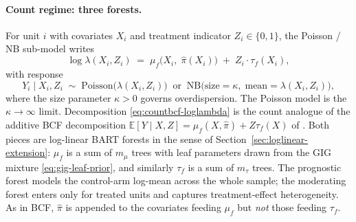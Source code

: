 \documentclass[11pt]{article}
\theoremstyle{plain}
\theoremstyle{definition}
\theoremstyle{remark}
\newcommand{\Poi}{\mathrm{Poisson}}
\newcommand{\NB}{\mathrm{NB}}
\newcommand{\E}{\mathbb{E}}
\newcommand{\muF}{\mu_f}
\newcommand{\tauF}{\tau_f}
\newcommand{\pihat}{\widehat{\pi}}
\begin{document}
\paragraph{Count regime: three forests.}
For unit $i$ with covariates $X_i$ and treatment indicator
$Z_i \in \{0, 1\}$, the Poisson / NB sub-model writes
\begin{equation}
  \boxed{\;
    \log \lambda(X_i, Z_i)
    \;=\;
    \muF\!\bigl(X_i,\; \pihat(X_i)\bigr)
    \;+\;
    Z_i \cdot \tauF(X_i),
  \;}
  \label{eq:countbcf-loglambda}
\end{equation}
with response
\begin{equation}
  Y_i \mid X_i, Z_i
  \;\sim\;
  \Poi\bigl(\lambda(X_i, Z_i)\bigr)
  \;\;\text{or}\;\;
  \NB\bigl(\mathrm{size} = \kappa,\; \mathrm{mean} = \lambda(X_i, Z_i)\bigr),
  \label{eq:countbcf-likelihoods}
\end{equation}
where the size parameter $\kappa > 0$ governs overdispersion. The
Poisson model is the $\kappa \to \infty$ limit. Decomposition
\eqref{eq:countbcf-loglambda} is the count analogue of the additive
BCF decomposition $\E[Y \mid X, Z] = \muF(X, \pihat) + Z \tauF(X)$ of
\citet{hahn2020bayesian}. Both pieces are log-linear BART forests in
the sense of Section~\ref{sec:loglinear-extension}: $\muF$ is a sum
of $m_\mu$ trees with leaf parameters drawn from the GIG mixture
\eqref{eq:gig-leaf-prior}, and similarly $\tauF$ is a sum of $m_\tau$
trees. The prognostic forest models the control-arm log-mean across
the whole sample; the moderating forest enters only for treated units
and captures treatment-effect heterogeneity. As in BCF, $\pihat$ is
appended to the covariates feeding $\muF$ but \emph{not} those
feeding $\tauF$.
\end{document}

